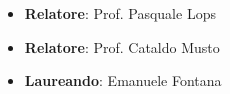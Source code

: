 \documentclass[12pt]{article}
\begin{document}
\begin{itemize}
    \item \textbf{Relatore}: Prof. Pasquale Lops
    \item \textbf{Relatore}: Prof. Cataldo Musto
    \item \textbf{Laureando}: Emanuele Fontana
\end{itemize}
\newpage
    \tableofcontents
    \newpage
    
    \newpage
    
    \newpage
    
    \newpage
    
    \newpage
    
    \newpage
    
    \newpage
    
    \newpage
    
    \newpage
    
\end{document}
